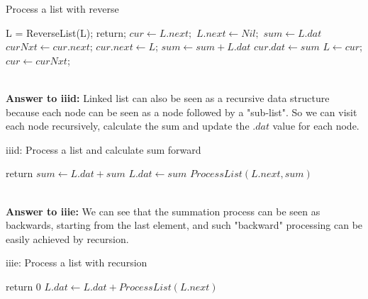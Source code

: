 \documentclass[a4paper,11pt]{article}
\theoremstyle{mytheor}
\begin{document}
\begin{algorithm}[H]
\caption{Process a list with reverse}
\begin{algorithmic}[1]
  \State L = ReverseList(L);
    \State return;
  \Else
    \State $cur \gets L.next;$
    \State $L.next \gets Nil;$ 
    \State $sum \gets L.dat$
      \State $curNxt \gets cur.next$;
      \State $cur.next \gets L$;
      \State $sum \gets sum + L.dat$
      \State $cur.dat \gets sum$
      \State $L \gets cur$;
      \State $cur \gets curNxt$;
    \EndWhile
  \EndIf
\EndProcedure
\end{algorithmic}
\end{algorithm}

\vspace{1.2in}
~\\


\noindent\textbf{Answer to iiid:}
Linked list can also be seen as a recursive data structure because each node can be seen as a node followed by a "sub-list". So we can visit each node recursively, calculate the sum and update the $.dat$ value for each node.

\begin{algorithm}[H]
\caption{iiid: Process a list and calculate sum forward}\label{iiid}
\begin{algorithmic}[1]
    \State return
  \Else
    \State $sum \gets L.dat + sum$
    \State $L.dat \gets sum$
    \State $ProcessList(L.next, sum)$
  \EndIf
\EndProcedure
\end{algorithmic}
\end{algorithm}

\vspace{1.2in}

~\\


\noindent\textbf{Answer to iiie:}
We can see that the summation process can be seen as backwards, starting from the last element, and such "backward" processing can be easily achieved by recursion.
\begin{algorithm}
\caption{iiie: Process a list with recursion}\label{iiie}
\begin{algorithmic}[1]
    \State return 0
  \Else
    \State $L.dat \gets L.dat + ProcessList(L.next)$
  \EndIf
\EndProcedure
\end{algorithmic}
\end{algorithm}
\end{document}
